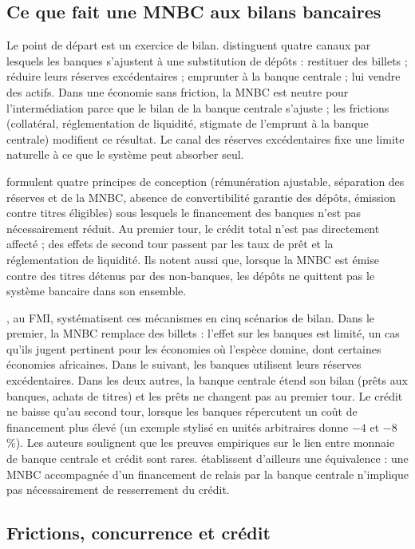\documentclass[11pt,a4paper]{article}
\begin{document}
	\subsection{Ce que fait une MNBC aux bilans bancaires}
	
	Le point de départ est un exercice de bilan. \citet{adalid2022} distinguent quatre canaux par lesquels les banques s'ajustent à une substitution de dépôts : restituer des billets ; réduire leurs réserves excédentaires ; emprunter à la banque centrale ; lui vendre des actifs. Dans une économie sans friction, la MNBC est neutre pour l'intermédiation parce que le bilan de la banque centrale s'ajuste ; les frictions (collatéral, réglementation de liquidité, stigmate de l'emprunt à la banque centrale) modifient ce résultat. Le canal des réserves excédentaires fixe une limite naturelle à ce que le système peut absorber seul.
	
	\citet{kumhof2018} formulent quatre principes de conception (rémunération ajustable, séparation des réserves et de la MNBC, absence de convertibilité garantie des dépôts, émission contre titres éligibles) sous lesquels le financement des banques n'est pas nécessairement réduit. Au premier tour, le crédit total n'est pas directement affecté ; des effets de second tour passent par les taux de prêt et la réglementation de liquidité. Ils notent aussi que, lorsque la MNBC est émise contre des titres détenus par des non-banques, les dépôts ne quittent pas le système bancaire dans son ensemble.
	
	\citet{bouis2024}, au FMI, systématisent ces mécanismes en cinq scénarios de bilan. Dans le premier, la MNBC remplace des billets : l'effet sur les banques est limité, un cas qu'ils jugent pertinent pour les économies où l'espèce domine, dont certaines économies africaines. Dans le suivant, les banques utilisent leurs réserves excédentaires. Dans les deux autres, la banque centrale étend son bilan (prêts aux banques, achats de titres) et les prêts ne changent pas au premier tour. Le crédit ne baisse qu'au second tour, lorsque les banques répercutent un coût de financement plus élevé (un exemple stylisé en unités arbitraires donne $-4$ et $-8$\,\%). Les auteurs soulignent que les preuves empiriques sur le lien entre monnaie de banque centrale et crédit sont rares. \citet{brunnermeier2019} établissent d'ailleurs une équivalence : une MNBC accompagnée d'un financement de relais par la banque centrale n'implique pas nécessairement de resserrement du crédit.
	
	\subsection{Frictions, concurrence et crédit}
	
\end{document}
